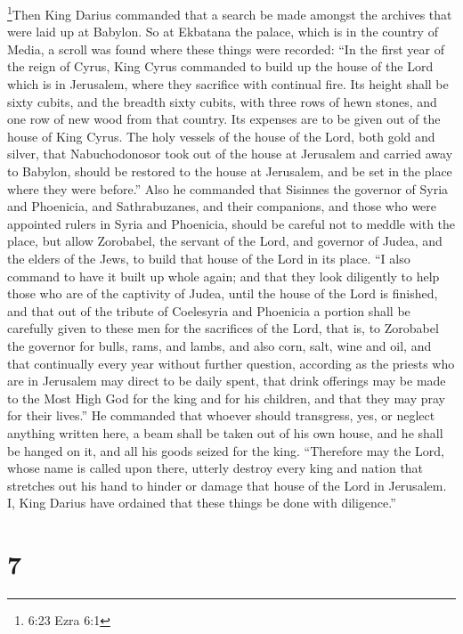  \footnote{6:23 Ezra 6:1}Then King Darius commanded that a
search be made amongst the archives that were laid up at Babylon. So at
Ekbatana the palace, which is in the country of Media, a scroll was
found where these things were recorded:  ``In the first
year of the reign of Cyrus, King Cyrus commanded to build up the house
of the Lord which is in Jerusalem, where they sacrifice with continual
fire.  Its height shall be sixty cubits, and the breadth
sixty cubits, with three rows of hewn stones, and one row of new wood
from that country. Its expenses are to be given out of the house of King
Cyrus.  The holy vessels of the house of the Lord, both
gold and silver, that Nabuchodonosor took out of the house at Jerusalem
and carried away to Babylon, should be restored to the house at
Jerusalem, and be set in the place where they were before.''
 Also he commanded that Sisinnes the governor of Syria and
Phoenicia, and Sathrabuzanes, and their companions, and those who were
appointed rulers in Syria and Phoenicia, should be careful not to meddle
with the place, but allow Zorobabel, the servant of the Lord, and
governor of Judea, and the elders of the Jews, to build that house of
the Lord in its place.  ``I also command to have it built
up whole again; and that they look diligently to help those who are of
the captivity of Judea, until the house of the Lord is finished,
 and that out of the tribute of Coelesyria and Phoenicia a
portion shall be carefully given to these men for the sacrifices of the
Lord, that is, to Zorobabel the governor for bulls, rams, and lambs,
 and also corn, salt, wine and oil, and that continually
every year without further question, according as the priests who are in
Jerusalem may direct to be daily spent,  that drink
offerings may be made to the Most High God for the king and for his
children, and that they may pray for their lives.''  He
commanded that whoever should transgress, yes, or neglect anything
written here, a beam shall be taken out of his own house, and he shall
be hanged on it, and all his goods seized for the king. 
``Therefore may the Lord, whose name is called upon there, utterly
destroy every king and nation that stretches out his hand to hinder or
damage that house of the Lord in Jerusalem.  I, King Darius
have ordained that these things be done with diligence.''

\hypertarget{section-6}{%
\section{7}\label{section-6}}

